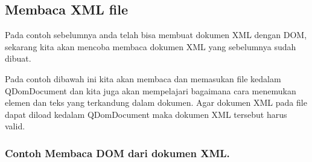 \subsection{Membaca XML file}\label{membaca-xml-file}

Pada contoh sebelumnya anda telah bisa membuat dokumen XML dengan DOM,
sekarang kita akan mencoba membaca dokumen XML yang sebelumnya sudah
dibuat.

Pada contoh dibawah ini kita akan membaca dan memasukan file kedalam
QDomDocument dan kita juga akan mempelajari bagaimana cara menemukan
elemen dan teks yang terkandung dalam dokumen. Agar dokumen XML pada
file dapat diload kedalam QDomDocument maka dokumen XML tersebut harus
valid.

\subsubsection*{Contoh Membaca DOM dari dokumen XML.}


